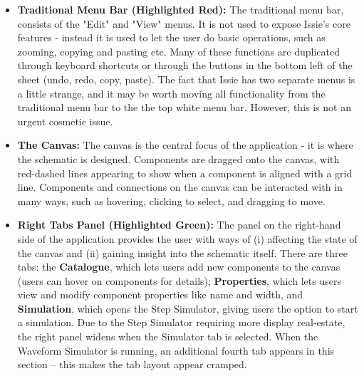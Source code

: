 \begin{itemize}
    \item[] \textbf{Traditional Menu Bar (Highlighted Red):} The traditional menu bar, consists of the "Edit" and "View" menus. It is not used to expose Issie's core features - instead it is used to let the user do basic operations, such as zooming, copying and pasting etc. Many of these functions are duplicated through keyboard shortcuts or through the buttons in the bottom left of the sheet (undo, redo, copy, paste). The fact that Issie has two separate menus is a little strange, and it may be worth moving all functionality from the traditional menu bar to the the top white menu bar. However, this is not an urgent cosmetic issue.
    \item[] \textbf{The Canvas:} The canvas is the central focus of the application - it is where the schematic is designed. Components are dragged onto the canvas, with red-dashed lines appearing to show when a component is aligned with a grid line. Components and connections on the canvas can be interacted with in many ways, such as hovering, clicking to select, and dragging to move.
    \item[] \textbf{Right Tabs Panel (Highlighted Green):} The panel on the right-hand side of the application provides the user with ways of (i) affecting the state of the canvas and (ii) gaining insight into the schematic itself. There are three tabs: the \textbf{Catalogue}, which lets users add new components to the canvas (users can hover on components for details); \textbf{Properties}, which lets users view and modify component properties like name and width, and \textbf{Simulation}, which opens the Step Simulator, giving users the option to start a simulation. Due to the Step Simulator requiring more display real-estate, the right panel widens when the Simulator tab is selected. When the Waveform Simulator is running, an additional fourth tab  appears in this section -- this makes the tab layout appear cramped.

\end{itemize}
